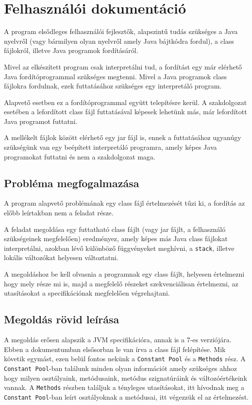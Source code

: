 \chapter{Felhasználói dokumentáció}
\label{ch:user}

A program elsődleges felhasználói fejlesztők, alapszintű tudás szükséges a Java nyelvről (vagy bármilyen olyan nyelvről amely Java bájtkódra fordul), a class fájlokról, illetve Java programok fordításáról.

Mivel az elkészített program csak interpretálni tud, a fordítást egy már elérhető Java fordítóprogrammal szükséges megtenni. Mivel a Java programok class fájlokra fordulnak, ezek futtatásához szükséges egy interpretáló program.

Alapvető esetben ez a fordítóprogrammal együtt telepítésre kerül. A szakdolgozat esetében a lefordított class fájl futtatásával képesek lehetünk más, már lefordított Java programot futtatni.

A mellékelt fájlok között elérhető egy jar fájl is, ennek a futtatásához ugyanúgy szükségünk van egy beépített interpretáló programra, amely képes Java programokat futtatni és nem a szakdolgozat maga.

\section{Probléma megfogalmazása}

A program alapvető problémának egy class fájl értelmezését tűzi ki, a fordítás az előbb leírtakban nem a feladat része. 

A feladat megoldása egy futtatható class fájlt (vagy jar fájlt, a felhasználó szükségeinek megfelelően) eredményez, amely képes más Java class fájlokat interpretálni, azokban lévő különböző függvényeket meghívni, a \lstinline{stack}, illetve lokális változókat helyesen változtatni.

A megoldáshoz be kell olvasnia a programnak egy class fájlt, helyesen értelmezni hogy mely része mi is, majd a megfelelő részeket szekvenciálisan értelmezni, az utasításokat a specifikációnak megfelelően végrehajtani. 

\section{Megoldás rövid leírása}

A megoldás erősen alapszik a JVM specifikációra, annak is a 7-es verziójára. Ebben a dokumentumban elsősorban le van írva a class fájl felépítése. Mik követik egymást, ezen belül fontos nekünk a \lstinline{Constant Pool} és a \lstinline{Methods} rész. A \lstinline{Constant Pool}-ban találunk minden olyan információt amely szükséges ahhoz hogy milyen osztályaink, metódusaink, metódus szignatúráink és változóértékeink vannak. A \lstinline{Methods} részben találjuk a tényleges utasításokat, itt hívodnak meg a \lstinline{Constant Pool}-ban leírt osztályoknak a metódusai, itt végezzük el az értelmezést.

